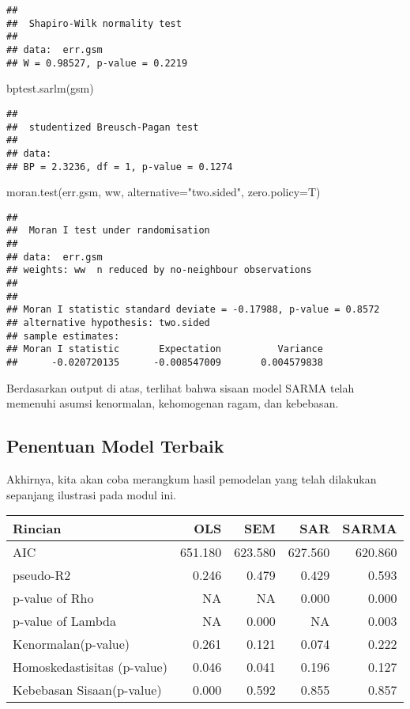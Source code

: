 \documentclass[
]{book}
\newenvironment{Shaded}{\begin{snugshade}}{\end{snugshade}}
\newcommand{\AttributeTok}[1]{\textcolor[rgb]{0.77,0.63,0.00}{#1}}
\newcommand{\FunctionTok}[1]{\textcolor[rgb]{0.00,0.00,0.00}{#1}}
\newcommand{\NormalTok}[1]{#1}
\newcommand{\StringTok}[1]{\textcolor[rgb]{0.31,0.60,0.02}{#1}}
\begin{document}
\begin{verbatim}
## 
##  Shapiro-Wilk normality test
## 
## data:  err.gsm
## W = 0.98527, p-value = 0.2219
\end{verbatim}

\begin{Shaded}
\begin{Highlighting}[]
\FunctionTok{bptest.sarlm}\NormalTok{(gsm)}
\end{Highlighting}
\end{Shaded}

\begin{verbatim}
## 
##  studentized Breusch-Pagan test
## 
## data:  
## BP = 2.3236, df = 1, p-value = 0.1274
\end{verbatim}

\begin{Shaded}
\begin{Highlighting}[]
\FunctionTok{moran.test}\NormalTok{(err.gsm, ww, }\AttributeTok{alternative=}\StringTok{"two.sided"}\NormalTok{, }\AttributeTok{zero.policy=}\NormalTok{T)}
\end{Highlighting}
\end{Shaded}

\begin{verbatim}
## 
##  Moran I test under randomisation
## 
## data:  err.gsm  
## weights: ww  n reduced by no-neighbour observations
##   
## 
## Moran I statistic standard deviate = -0.17988, p-value = 0.8572
## alternative hypothesis: two.sided
## sample estimates:
## Moran I statistic       Expectation          Variance 
##      -0.020720135      -0.008547009       0.004579838
\end{verbatim}

Berdasarkan output di atas, terlihat bahwa sisaan model SARMA telah memenuhi asumsi kenormalan, kehomogenan ragam, dan kebebasan.

\hypertarget{penentuan-model-terbaik}{%
\subsection{Penentuan Model Terbaik}\label{penentuan-model-terbaik}}

Akhirnya, kita akan coba merangkum hasil pemodelan yang telah dilakukan sepanjang ilustrasi pada modul ini.

\captionsetup[table]{labelformat=empty,skip=1pt}
\begin{longtable}{lrrrr}
\toprule
Rincian & OLS & SEM & SAR & SARMA \\ 
\midrule
AIC & 651.180 & 623.580 & 627.560 & 620.860 \\ 
pseudo-R2 & 0.246 & 0.479 & 0.429 & 0.593 \\ 
p-value of Rho & NA & NA & 0.000 & 0.000 \\ 
p-value of Lambda & NA & 0.000 & NA & 0.003 \\ 
Kenormalan(p-value) & 0.261 & 0.121 & 0.074 & 0.222 \\ 
Homoskedastisitas (p-value) & 0.046 & 0.041 & 0.196 & 0.127 \\ 
Kebebasan Sisaan(p-value) & 0.000 & 0.592 & 0.855 & 0.857 \\ 
\bottomrule
\end{longtable}
\end{document}
